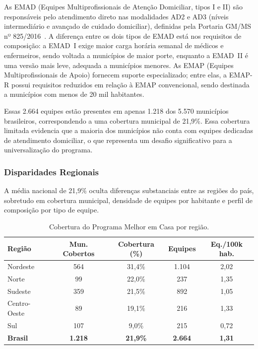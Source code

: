 \documentclass[12pt]{article}
\DeclareRobustCommand{\citelink}[2]{#2~\cite{#1}}
\begin{document}
As EMAD (Equipes Multiprofissionais de Atenção Domiciliar, tipos I e II) são responsáveis pelo atendimento direto nas modalidades AD2 e AD3 (níveis intermediário e avançado de cuidado domiciliar), definidas pela \citelink{portaria825}{Portaria GM/MS nº 825/2016}. A diferença entre os dois tipos de EMAD está nos requisitos de composição: a EMAD~I exige maior carga horária semanal de médicos e enfermeiros, sendo voltada a municípios de maior porte, enquanto a EMAD~II é uma versão mais leve, adequada a municípios menores. As EMAP (Equipes Multiprofissionais de Apoio) fornecem suporte especializado; entre elas, a EMAP-R possui requisitos reduzidos em relação à EMAP convencional, sendo destinada a municípios com menos de 20 mil habitantes.

Essas 2.664 equipes estão presentes em apenas 1.218 dos 5.570 municípios brasileiros, correspondendo a uma cobertura municipal de 21,9\%. Essa cobertura limitada evidencia que a maioria dos municípios não conta com equipes dedicadas de atendimento domiciliar, o que representa um desafio significativo para a universalização do programa.

\subsubsection{Disparidades Regionais}

A média nacional de 21,9\% oculta diferenças substanciais entre as regiões do país, sobretudo em cobertura municipal, densidade de equipes por habitante e perfil de composição por tipo de equipe.

\begin{table}[H]
\centering
\caption{Cobertura do Programa Melhor em Casa por região.}\label{tabelaa}
\begin{tabular}{|l|c|c|c|c|}
\hline
\textbf{Região} & \textbf{Mun. Cobertos} & \textbf{Cobertura (\%)} & \textbf{Equipes} & \textbf{Eq./100k hab.} \\
\hline
Nordeste & 564 & 31,4\% & 1.104 & 2,02 \\
Norte & 99 & 22,0\% & 237 & 1,35 \\
Sudeste & 359 & 21,5\% & 892 & 1,05 \\
Centro-Oeste & 89 & 19,1\% & 216 & 1,33 \\
Sul & 107 & 9,0\% & 215 & 0,72 \\
\hline
\textbf{Brasil} & \textbf{1.218} & \textbf{21,9\%} & \textbf{2.664} & \textbf{1,31} \\
\hline
\end{tabular}
\end{table}
\end{document}
